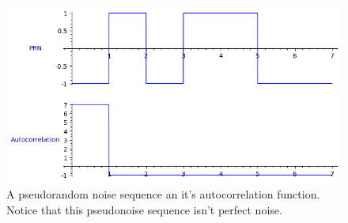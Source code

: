 \begin{figure}[ht!] %
\begin{center}
\includegraphics[width=0.7\linewidth]{Chapters/Introduction/signals_prn}
\end{center}
\caption{A pseudorandom noise sequence an it's autocorrelation function.
Notice that this pseudonoise sequence isn't perfect noise.}
\label{introduction_signals_autocorrelation}
\end{figure}


